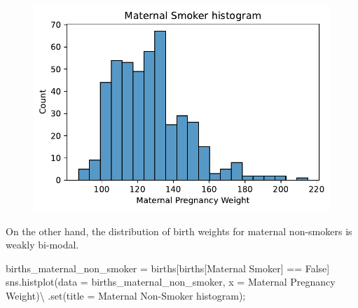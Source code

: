 \documentclass[
  letterpaper,
  DIV=11,
  numbers=noendperiod]{scrreprt}
\newenvironment{Shaded}{\begin{snugshade}}{\end{snugshade}}
\newcommand{\BuiltInTok}[1]{\textcolor[rgb]{0.00,0.23,0.31}{#1}}
\newcommand{\NormalTok}[1]{\textcolor[rgb]{0.00,0.23,0.31}{#1}}
\newcommand{\OperatorTok}[1]{\textcolor[rgb]{0.37,0.37,0.37}{#1}}
\newcommand{\StringTok}[1]{\textcolor[rgb]{0.13,0.47,0.30}{#1}}
\newcommand{\VariableTok}[1]{\textcolor[rgb]{0.07,0.07,0.07}{#1}}
\begin{document}
\begin{figure}[H]

{\centering \includegraphics{visualization_1/visualization_1_files/figure-pdf/cell-13-output-1.pdf}

}

\end{figure}

On the other hand, the distribution of birth weights for maternal
non-smokers is weakly bi-modal.

\begin{Shaded}
\begin{Highlighting}[]
\NormalTok{births\_maternal\_non\_smoker }\OperatorTok{=}\NormalTok{ births[births[}\StringTok{\textquotesingle{}Maternal Smoker\textquotesingle{}}\NormalTok{] }\OperatorTok{==} \VariableTok{False}\NormalTok{]}
\NormalTok{sns.histplot(data }\OperatorTok{=}\NormalTok{ births\_maternal\_non\_smoker, x }\OperatorTok{=} \StringTok{\textquotesingle{}Maternal Pregnancy Weight\textquotesingle{}}\NormalTok{)}\OperatorTok{\textbackslash{}}
\NormalTok{            .}\BuiltInTok{set}\NormalTok{(title }\OperatorTok{=} \StringTok{\textquotesingle{}Maternal Non{-}Smoker histogram\textquotesingle{}}\NormalTok{)}\OperatorTok{;}
\end{Highlighting}
\end{Shaded}
\end{document}

